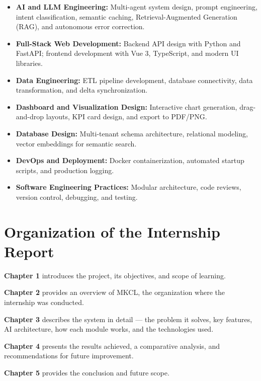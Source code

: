\documentclass[12pt,a4paper]{report}
\begin{document}
\begin{itemize}[leftmargin=1.5cm]
    \item \textbf{AI and LLM Engineering:} Multi-agent system design, prompt engineering, intent classification, semantic caching, Retrieval-Augmented Generation (RAG), and autonomous error correction.
    \item \textbf{Full-Stack Web Development:} Backend API design with Python and FastAPI; frontend development with Vue 3, TypeScript, and modern UI libraries.
    \item \textbf{Data Engineering:} ETL pipeline development, database connectivity, data transformation, and delta synchronization.
    \item \textbf{Dashboard and Visualization Design:} Interactive chart generation, drag-and-drop layouts, KPI card design, and export to PDF/PNG.
    \item \textbf{Database Design:} Multi-tenant schema architecture, relational modeling, vector embeddings for semantic search.
    \item \textbf{DevOps and Deployment:} Docker containerization, automated startup scripts, and production logging.
    \item \textbf{Software Engineering Practices:} Modular architecture, code reviews, version control, debugging, and testing.
\end{itemize}

\section{Organization of the Internship Report}

\textbf{Chapter 1} introduces the project, its objectives, and scope of learning.

\textbf{Chapter 2} provides an overview of MKCL, the organization where the internship was conducted.

\textbf{Chapter 3} describes the system in detail --- the problem it solves, key features, AI architecture, how each module works, and the technologies used.

\textbf{Chapter 4} presents the results achieved, a comparative analysis, and recommendations for future improvement.

\textbf{Chapter 5} provides the conclusion and future scope.

\end{document}
